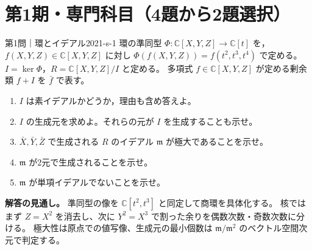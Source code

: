 \section{第1期・専門科目（4題から2題選択）}

\begin{problem}{第1問｜環とイデアル}{2021-s-1}
環の準同型 $\Phi:\mathbb C[X,Y,Z]\to\mathbb C[t]$ を，$f(X,Y,Z)\in\mathbb C[X,Y,Z]$ に対し
$\Phi(f(X,Y,Z))=f(t^2,t^3,t^4)$ で定める。$I=\ker\Phi$，$R=\mathbb C[X,Y,Z]/I$ と定める。
多項式 $f\in\mathbb C[X,Y,Z]$ が定める剰余類 $f+I$ を $\bar f$ で表す。
\begin{enumerate}
  \item[(1)] $I$ は素イデアルかどうか，理由も含め答えよ。
  \item[(2)] $I$ の生成元を求めよ。それらの元が $I$ を生成することも示せ。
  \item[(3)] $\bar X,\bar Y,\bar Z$ で生成される $R$ のイデアル $\mathfrak m$ が極大であることを示せ。
  \item[(4)] $\mathfrak m$ が2元で生成されることを示せ。
  \item[(5)] $\mathfrak m$ が単項イデアルでないことを示せ。
\end{enumerate}
\end{problem}
\begin{memo*}
\textbf{解答の見通し。}
準同型の像を $\mathbb C[t^2,t^3]$ と同定して商環を具体化する。
核ではまず $Z=X^2$ を消去し、次に $Y^2=X^3$ で割った余りを偶数次数・奇数次数に分ける。
極大性は原点での値写像、生成元の最小個数は
$\mathfrak m/\mathfrak m^2$ のベクトル空間次元で判定する。
\end{memo*}
